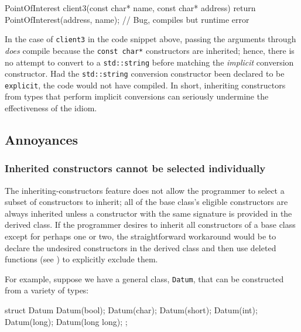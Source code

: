 \begin{emcppslisting}[emcppsbatch=e11]
PointOfInterest client3(const char* name, const char* address)
{
    return PointOfInterest(address, name);  // Bug, compiles but runtime error
}
\end{emcppslisting}

\noindent In the case of \lstinline!client3! in the code snippet above, passing the arguments through
\emph{does} compile because the \lstinline!const!~\lstinline!char*!
constructors are inherited; hence, there is no attempt to convert
to a \lstinline!std::string! before matching the \emph{implicit} conversion
constructor. Had the \lstinline!std::string! conversion
constructor been declared to be \lstinline!explicit!, the code would not
have compiled. In short, inheriting constructors from types that perform implicit
conversions can seriously undermine the effectiveness of the  idiom.

\subsection[Annoyances]{Annoyances}\label{annoyances-inheritingctor}

\subsubsection[Inherited constructors cannot be selected individually]{Inherited constructors cannot be selected individually}\label{inherited-constructors-cannot-be-selected-individually}

The inheriting-constructors feature does not allow the programmer
to select a subset of constructors to inherit; all of the base
class's eligible constructors are always inherited unless a constructor
with the same signature is provided in the derived class. If the
programmer desires to inherit all constructors of a base class except
for perhaps one or two, the straightforward workaround would be to
declare the undesired constructors in the derived class and then use
deleted functions (see )
to explicitly exclude them.

For example, suppose we have a general class, \lstinline!Datum!, that can
be constructed from a variety of types:

\begin{emcppslisting}[emcppsbatch=e12]
struct Datum
{
    Datum(bool);
    Datum(char);
    Datum(short);
    Datum(int);
    Datum(long);
    Datum(long long);
};
\end{emcppslisting}

